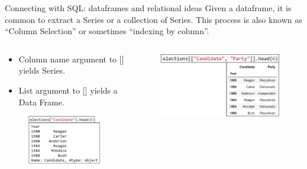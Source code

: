 \documentclass[aspectratio=169]{../latex_main/tntbeamer}  %
\begin{document}
	
	\begin{frame}{Connecting with SQL: dataframes and relational ideas}
	       Given a dataframe, it is common to extract a Series or a collection of Series. This process is also known as “Column Selection” or sometimes “indexing by column”. 
	      \begin{columns}
	       
	        \begin{column}{.5\textwidth}
	            \begin{itemize}
	                \item Column name argument to [] yields Series.
	                \item List argument to [] yields a Data Frame.
	            \end{itemize}
	                  \begin{figure}
	                            \includegraphics[scale=.3]{Bild11}  
	                  \end{figure}
	        \end{column}
	        
	        
	        \begin{column}{.5\textwidth}
	                  \begin{figure}
	                            \includegraphics[scale=.3]{Bild12}  
	                  \end{figure}
	        \end{column}
	      \end{columns}
	\end{frame}
	
\end{document}
